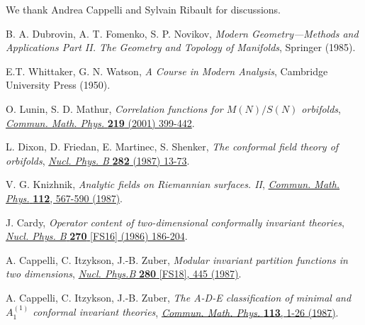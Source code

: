 \documentclass[a4paper,11pt]{article}
\begin{document}
\acknowledgments
We thank Andrea Cappelli and Sylvain Ribault for discussions.






\begin{thebibliography}{99}

 B. A. Dubrovin, A. T. Fomenko, S. P. Novikov, \textit{Modern Geometry---Methods and Applications Part II. The Geometry and Topology of Manifolds}, Springer (1985).

 E.T. Whittaker, G. N. Watson, \emph{A Course in Modern Analysis}, Cambridge University Press (1950).

 O. Lunin, S. D. Mathur, \emph{Correlation functions for $M(N)/S(N)$ orbifolds}, \href{https://doi.org/10.1007/s002200100431}{\emph{Commun. Math. Phys.} {\bf 219} (2001) 399-442}.

 L. Dixon, D. Friedan, E. Martinec, S. Shenker, \textit{The conformal field theory of orbifolds}, 
\href{https://doi.org/10.1016/0550-3213(87)90676-6}{\emph{Nucl. Phys. B} {\bf 282} (1987) 13-73}.

 V. G. Knizhnik, \emph{Analytic fields on Riemannian surfaces. II}, 
\href{https://doi.org/10.1007/BF01225373}{\emph{Commun. Math. Phys.} {\bf 112}, 567-590 (1987)}.

 J. Cardy, \emph{Operator content of two-dimensional conformally invariant theories}, 
\href{https://doi.org/10.1016/0550-3213(86)90552-3}{\emph{Nucl. Phys. B} {\bf 270} [FS16] (1986) 186-204}.

 A. Cappelli, C. Itzykson, J.-B. Zuber, \emph{Modular invariant partition functions in two dimensions}, 
\href{https://doi.org/10.1016/0550-3213(87)90155-6}{\emph{Nucl. Phys.B} {\bf 280} [FS18], 445 (1987)}.

 A. Cappelli, C. Itzykson, J.-B. Zuber, \emph{The A-D-E classification of minimal and $A_1^{(1)}$ conformal invariant theories}, \href{https://doi.org/10.1007/BF01221394}{\emph{Commun. Math. Phys.} {\bf 113}, 1-26 (1987)}.


\end{thebibliography}
\end{document}
